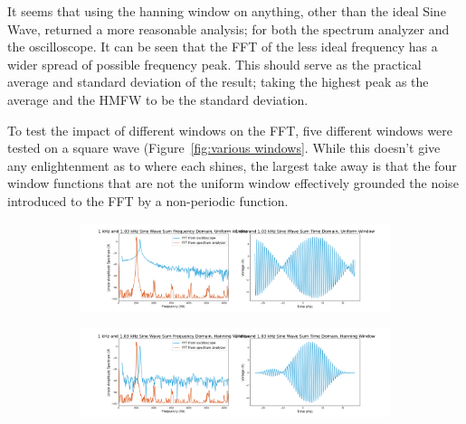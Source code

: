 \documentclass[12pt]{article}
\begin{document}
    It seems that using the hanning window on anything, other than the ideal Sine Wave, returned a more reasonable analysis; for both the spectrum analyzer and the oscilloscope. It can be seen that the FFT of the less ideal frequency has a wider spread of possible frequency peak. This should serve as the practical average and standard deviation of the result; taking the highest peak as the average and the HMFW to be the standard deviation.
    
    To test the impact of different windows on the FFT, five different windows were tested on a square wave (Figure~\ref{fig:various windows}. While this doesn't give any enlightenment as to where each shines, the largest take away is that the four window functions that are not the uniform window effectively grounded the noise introduced to the FFT by a non-periodic function.  
    
    \begin{figure}[!ht]
        \centering
        \begin{subfigure}[h]{\textwidth}
        \includegraphics[width=\textwidth]{1 kHz and 1_03 kHz Sine Wave Sum (uniform)}
        \caption{}
        \label{fig:sine sum}
        \end{subfigure}
        \begin{subfigure}[h]{\textwidth}
        \includegraphics[width=\textwidth]{1 kHz and 1_03 kHz Sine Wave Sum (hanning)}
        \caption{}
        \label{fig:sine sum}
        \end{subfigure}
    \end{figure} %
    
\end{document}
